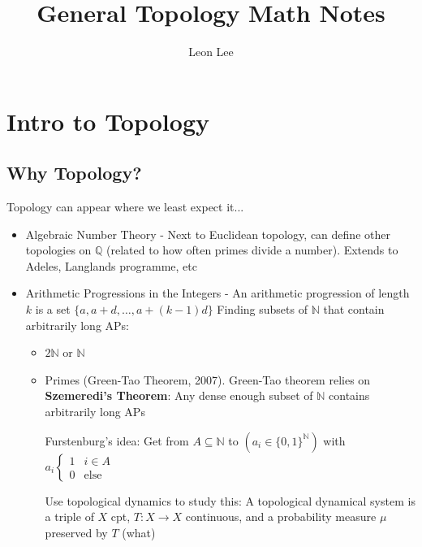 \documentclass{article}
\title{General Topology Math Notes}
\author{Leon Lee}
\begin{document}
\maketitle
\newpage
\tableofcontents
\newpage

\section{Intro to Topology}
\subsection{Why Topology?}

Topology can appear where we least expect it...
\begin{itemize}
    \item Algebraic Number Theory - Next to Euclidean topology, can define other topologies on $\mathbb{Q}$ (related to how often primes divide a number). Extends to Adeles, Langlands programme, etc
    \item Arithmetic Progressions in the Integers - An arithmetic progression of length $k$ is a set $\{a, a+d,\dots,a+(k-1)d\}$
        Finding subsets of $\mathbb{N}$ that contain arbitrarily long APs:
        \begin{itemize}
            \item $2\mathbb{N}$ or $\mathbb{N}$
            \item Primes (Green-Tao Theorem, 2007). Green-Tao theorem relies on \textbf{Szemeredi's Theorem}: Any dense enough subset of $\mathbb{N}$ contains arbitrarily long APs

                Furstenburg's idea: Get from $A \subseteq\mathbb{N}$ to $(a_{i}\in \{0, 1\}^{\mathbb{N}})$ with $a_{i} \begin{cases}
                    1 & i\in A \\
                    0 & \text{else}
                \end{cases}$

                Use topological dynamics to study this: A topological dynamical system is a triple of $X$ cpt, $T : X \to X$ continuous, and a probability measure $\mu$ preserved by $T$ (what)
        \end{itemize}
\end{itemize}
\end{document}
